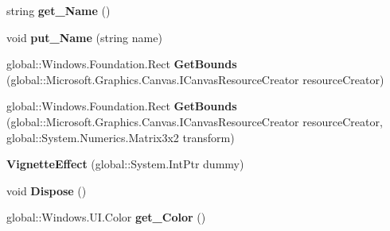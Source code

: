 \begin{DoxyCompactItemize}
\item 
\mbox{\label{class_microsoft_1_1_graphics_1_1_canvas_1_1_effects_1_1_vignette_effect_aaaf85e8078d87757a85a30a84de1bb4b}} 
string {\bfseries get\+\_\+\+Name} ()
\item 
\mbox{\label{class_microsoft_1_1_graphics_1_1_canvas_1_1_effects_1_1_vignette_effect_abc40e41ba6ae067d56ca62ed8c10f292}} 
void {\bfseries put\+\_\+\+Name} (string name)
\item 
\mbox{\label{class_microsoft_1_1_graphics_1_1_canvas_1_1_effects_1_1_vignette_effect_af51b08a59d366ec46f8f8cd729c45b98}} 
global\+::\+Windows.\+Foundation.\+Rect {\bfseries Get\+Bounds} (global\+::\+Microsoft.\+Graphics.\+Canvas.\+I\+Canvas\+Resource\+Creator resource\+Creator)
\item 
\mbox{\label{class_microsoft_1_1_graphics_1_1_canvas_1_1_effects_1_1_vignette_effect_afa665f684b9b46082ac4bc19cf044be3}} 
global\+::\+Windows.\+Foundation.\+Rect {\bfseries Get\+Bounds} (global\+::\+Microsoft.\+Graphics.\+Canvas.\+I\+Canvas\+Resource\+Creator resource\+Creator, global\+::\+System.\+Numerics.\+Matrix3x2 transform)
\item 
\mbox{\label{class_microsoft_1_1_graphics_1_1_canvas_1_1_effects_1_1_vignette_effect_ae769910619bfea37cb3260c684934e3d}} 
{\bfseries Vignette\+Effect} (global\+::\+System.\+Int\+Ptr dummy)
\item 
\mbox{\label{class_microsoft_1_1_graphics_1_1_canvas_1_1_effects_1_1_vignette_effect_a7a8de4daab6ece7ddea70ba91c2d83b2}} 
void {\bfseries Dispose} ()
\item 
\mbox{\label{class_microsoft_1_1_graphics_1_1_canvas_1_1_effects_1_1_vignette_effect_af4d9c28e4c0feac0fb70bb07348ae835}} 
global\+::\+Windows.\+U\+I.\+Color {\bfseries get\+\_\+\+Color} ()

\end{DoxyCompactItemize}
